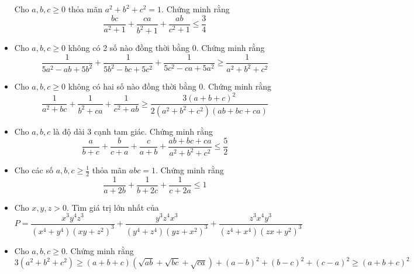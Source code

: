 \documentclass[11pt]{scrartcl}
\begin{document}
\begin{itemize}[label=, leftmargin=0em, itemsep=-0em]
\begin{btvn}
                Cho $a,b,c \geq 0$ thỏa mãn $a^2 + b^2 + c^2 = 1$. Chứng minh rằng
                \[
                    \frac{bc}{a^2 + 1} + \frac{ca}{b^2 + 1} + \frac{ab}{c^2 + 1} \leq \frac{3}{4}
                \]
            \end{btvn}
            \item\begin{btvn}
                Cho $a, b, c \geq 0$ không có 2 số nào đồng thời bằng $0$. Chứng minh rằng
                \[
                    \frac{1}{5a^2 - ab + 5b^2} + \frac{1}{5b^2 - bc + 5c^2} + \frac{1}{5c^2 - ca + 5a^2} \geq \frac{1}{a^2 + b^2 + c^2}
                \]
            \end{btvn}
            \item \begin{btvn}
                Cho $a,b,c \geq 0$ không có hai số nào đồng thời bằng $0$. Chứng minh rằng
                \[
                    \frac{1}{a^2 + bc} + \frac{1}{b^2 + ca} + \frac{1}{c^2 + ab} \geq \frac{3(a + b + c)^2}{2(a^2 + b^2 + c^2)(ab + bc + ca)}
                \]
            \end{btvn}
            \item\begin{btvn}
                Cho $a,b,c$ là độ dài 3 cạnh tam giác. Chứng minh rằng
                \[
                    \frac{a}{b + c} + \frac{b}{c + a} + \frac{c}{a + b} + \frac{ab + bc + ca}{a^2 + b^2 + c^2} \leq \frac{5}{2}
                \]
            \end{btvn}

            \item\begin{btvn}
                Cho các số $a,b,c \geq \frac{1}{2}$ thỏa mãn $abc = 1$. Chứng minh rằng
                \[
                    \frac{1}{a + 2b} + \frac{1}{b + 2c} + \frac{1}{c + 2a} \leq 1
                \]
            \end{btvn}
            
        \item \begin{btvn} Cho $x,y,z >0$. Tìm giá trị lớn nhất của
        \[P=\frac{x^3y^4z^3}{(x^4+y^4)(xy+z^2)^3}+\frac{y^3z^4x^3}{(y^4+z^4)(yz+x^2)^3}+\frac{z^3x^4y^3}{(z^4+x^4)(zx+y^2)^3}\]
        \end{btvn}
        \item \begin{btvn} Cho $a,b,c \geq 0$. Chứng minh rằng
            \[{ 3(a^2+b^2+c^2) \geq (a+b+c)(\sqrt{ab}+\sqrt{bc}+\sqrt{ca})+(a-b)^2+(b-c)^2+(c-a)^2 \geq (a+b+c)^2}\]
            

\end{btvn}
\end{itemize}
\end{document}
